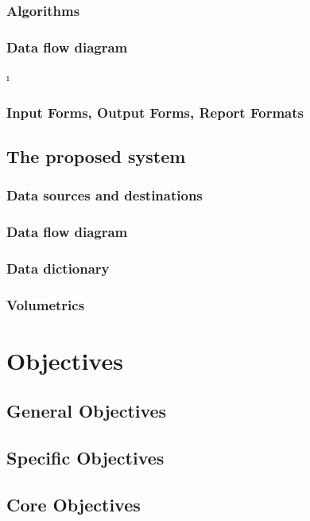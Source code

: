 \subsubsection{Algorithms}

\subsubsection{Data flow diagram}\i

\subsubsection{Input Forms, Output Forms, Report Formats}

\subsection{The proposed system}

\subsubsection{Data sources and destinations}

\subsubsection{Data flow diagram}

\subsubsection{Data dictionary}

\subsubsection{Volumetrics}

\section{Objectives}

\subsection{General Objectives}

\subsection{Specific Objectives}

\subsection{Core Objectives}

